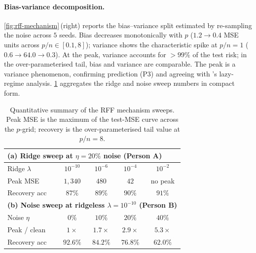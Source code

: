 \paragraph{Bias-variance decomposition.} \cref{fig:rff-mechanism}\,(right) reports the bias--variance split estimated by re-sampling the noise across $5$ seeds. Bias decreases monotonically with $p$ ($1.2 \to 0.4$ MSE units across $p/n \in [0.1, 8]$); variance shows the characteristic spike at $p/n=1$ ($0.6 \to 64.0 \to 0.3$). At the peak, variance accounts for $> 99\%$ of the test risk; in the over-parameterised tail, bias and variance are comparable. The peak is a variance phenomenon, confirming prediction (P3) and agreeing with \citet{dascoli2020double}'s lazy-regime analysis. \cref{tab:rff-mechanism} aggregates the ridge and noise sweep numbers in compact form.

\begin{table}[t]
  \centering
  \small
  \caption{Quantitative summary of the RFF mechanism sweeps. Peak MSE is the maximum of the test-MSE curve across the $p$-grid; recovery is the over-parameterised tail value at $p/n=8$.}
  \label{tab:rff-mechanism}
  \begin{tabular}{@{}lcccc@{}}
    \toprule
    \multicolumn{5}{l}{\textbf{(a) Ridge sweep at $\eta = 20\%$ noise (Person A)}} \\
    \midrule
    Ridge $\lambda$ & $10^{-10}$ & $10^{-6}$ & $10^{-4}$ & $10^{-2}$ \\
    Peak MSE        & $1{,}340$  & $480$     & $42$      & no peak \\
    Recovery acc    & $87\%$     & $89\%$    & $90\%$    & $91\%$ \\
    \midrule
    \multicolumn{5}{l}{\textbf{(b) Noise sweep at ridgeless $\lambda = 10^{-10}$ (Person B)}} \\
    \midrule
    Noise $\eta$    & $0\%$     & $10\%$    & $20\%$    & $40\%$ \\
    Peak / clean    & $1\times$ & $1.7\times$ & $2.9\times$ & $5.3\times$ \\
    Recovery acc    & $92.6\%$  & $84.2\%$  & $76.8\%$  & $62.0\%$ \\
    \bottomrule
  \end{tabular}
\end{table}

